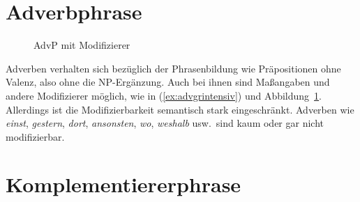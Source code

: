 \section{Adverbphrase}

\label{sec:advgr}



\begin{figure}[!htbp]
  \centering
  \caption{AdvP mit Modifizierer}
  \label{fig:advgrintensiv}
\end{figure}

Adverben verhalten sich bezüglich der Phrasenbildung wie Präpositionen ohne Valenz, also ohne die NP-Ergänzung.
Auch bei ihnen sind Maßangaben und andere Modifizierer möglich, wie in (\ref{ex:advgrintensiv}) und Abbildung~\ref{fig:advgrintensiv}.
Allerdings ist die Modifizierbarkeit semantisch stark eingeschränkt.
Adverben wie \textit{einst}, \textit{gestern}, \textit{dort}, \textit{ansonsten}, \textit{wo}, \textit{weshalb} usw.\ sind kaum oder gar nicht modifizierbar.

\begin{exe}
  \ex\label{ex:advgrintensiv} 
  \begin{xlist}
  \end{xlist}
\end{exe}




\section{Komplementiererphrase}

\label{sec:subjgr}


